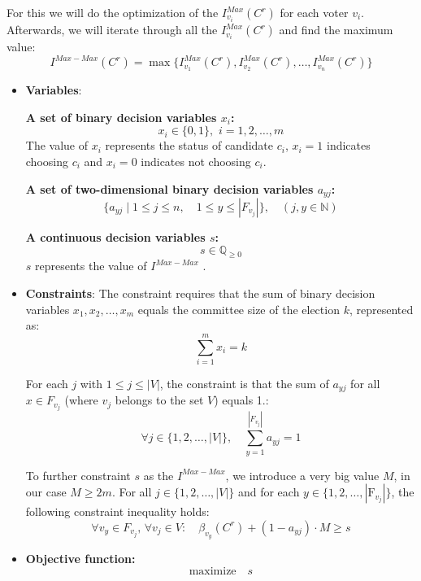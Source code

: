 \documentclass{article}
\begin{document}
For this we will do the optimization of the $I_{v_i}^{Max}(C^{r})$ for each voter $v_i$. Afterwards, we will iterate through all the $I_{v_i}^{Max}(C^{r})$ and find the maximum value:
  \[I^{Max-Max}(C^{r}) = \max\{ I_{v_1}^{Max}(C^{r}), I_{v_2}^{Max}(C^{r}), \ldots, I_{v_n}^{Max}(C^{r}) \}\]
\begin{itemize}

  \item \textbf{Variables}: 

\textbf{A set of binary decision variables $x_i$:}\[  x_i \in \{0, 1\} , \,\, i=1,2,\dots, m \] The value of $x_i$ represents the status of candidate $c_i$, \(x_i = 1\) indicates choosing $c_i$ and \(x_i = 0\) indicates not choosing $c_i$.


\textbf{A set of two-dimensional binary decision variables \( a_{yj} \):}
\[
\{ a_{yj} \mid 1 \leq j \leq n, \quad 1 \leq y \leq |F_{v_j}| \},  \quad (j, y \in \mathbb{N})
\]

\textbf{A continuous decision variables $s$:} 
\[  s\in \mathbb{Q}_{\geq 0} \] 
$s$ represents the value of $I^{Max-Max}$ .
    \item \textbf{Constraints}:
The constraint requires that the sum of binary decision variables \(x_1, x_2, \ldots, x_m\) equals the committee size of the election \(k\), represented as:
\begin{equation} \sum_{i=1}^m x_i = k     \label{eq:ilpmaxmax1}
\end{equation}

For each \(j\) with \(1 \leq j \leq |V|\), the constraint is that the sum of \( a_{yj} \) for all \( x \in F_{v_j} \) (where \( v_j \) belongs to the set \( V \)) equals 1.:
\begin{equation} \forall j \in \{1, 2, \ldots, |V|\}, \quad \sum_{y=1}^{|F_{v_j}|} a_{yj} = 1 \label{eq:ilpavgmax2}
\end{equation}

To further constraint $s$ as the $I^{Max-Max}$, we introduce a very big value $M$, in our case $M \geq  2m$. For all \( j \in \{1, 2, \ldots, |V|\} \) and for each  \( y \in \{1, 2, \ldots, |\text{F}_{v_j}|\} \), the following constraint inequality holds:
\begin{equation} \forall v_y \in F_{v_j}, \,  \forall v_j \in V :\quad \beta_{v_y}(C^{r}) + (1 - a_{yj})\cdot M \geq s \label{eq:ilpavgmax3}
\end{equation}
  
  \item  \textbf{Objective function:}
  \[\text{maximize} \quad s \]


\end{itemize}
\end{document}
